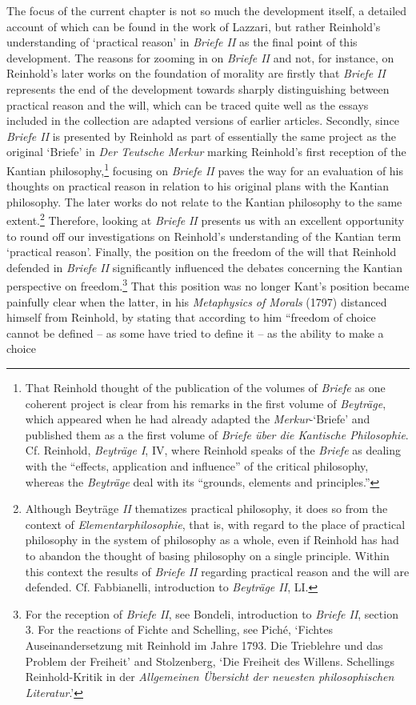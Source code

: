 The focus of the current chapter is not so much the development itself, a detailed account of which can be found in the work of Lazzari, but rather Reinhold's understanding of `practical reason' in \textit{Briefe II} as the final point of this development. The reasons for zooming in on \textit{Briefe II} and not, for instance, on Reinhold's later works on the foundation of morality are firstly that \textit{Briefe} \textit{II} represents the end of the development towards sharply distinguishing between practical reason and the will, which can be traced quite well as the essays included in the collection are adapted versions of earlier articles. Secondly, since \textit{Briefe II} is presented by Reinhold as part of essentially the same project as the original `Briefe' in \textit{Der Teutsche Merkur} marking Reinhold's first reception of the Kantian philosophy,\footnote{ That Reinhold thought of the publication of the volumes of \textit{Briefe }as one coherent project is clear from his remarks in the first volume of \textit{Beytr\"{a}ge}, which appeared when he had already adapted the \textit{Merkur}{-}`Briefe' and published them as a the first volume of \textit{Briefe \"{u}ber die Kantische Philosophie}. Cf. Reinhold, \textit{Beytr\"{a}ge I}, IV, where Reinhold speaks of the \textit{Briefe }as dealing with the ``effects, application and influence'' of the critical philosophy, whereas the \textit{Beytr\"{a}ge} deal with its ``grounds, elements and principles.''} focusing on \textit{Briefe II} paves the way for an evaluation of his thoughts on practical reason in relation to his original plans with the Kantian philosophy. The later works do not relate to the Kantian philosophy to the same extent.\footnote{ Although Beytr\"{a}ge \textit{II} thematizes practical philosophy, it does so from the context of \textit{Elementarphilosophie}, that is, with regard to the place of practical philosophy in the system of philosophy as a whole, even if Reinhold has had to abandon the thought of basing philosophy on a single principle. Within this context the results of \textit{Briefe II }regarding practical reason and the will are defended. Cf. Fabbianelli, introduction to \textit{Beytr\"{a}ge II}, LI. } Therefore, looking at \textit{Briefe} \textit{II} presents us with an excellent opportunity to round off our investigations on Reinhold's understanding of the Kantian term `practical reason'. Finally, the position on the freedom of the will that Reinhold defended in \textit{Briefe II} significantly influenced the debates concerning the Kantian perspective on freedom.\footnote{ For the reception of \textit{Briefe II}, see Bondeli, introduction to \textit{Briefe II}, section 3. For the reactions of Fichte and Schelling, see Pich\'{e}, `Fichtes Auseinandersetzung mit Reinhold im Jahre 1793. Die Trieblehre und das Problem der Freiheit'  and Stolzenberg, `Die Freiheit des Willens. Schellings Reinhold{-}Kritik in der \textit{Allgemeinen \"{U}bersicht der neuesten philosophischen Literatur}.'} That this position was no longer Kant's position became painfully clear when the latter, in his \textit{Metaphysics of Morals }(1797) distanced himself from Reinhold, by stating that according to him ``freedom of choice cannot be defined {--} as some have tried to define it {--} as the ability to make a choice 